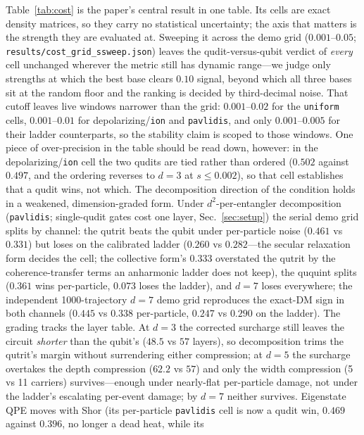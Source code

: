 \documentclass[aps,pra,reprint,superscriptaddress,nofootinbib,floatfix]{revtex4-2}
\begin{document}
Table~\ref{tab:cost} is the paper's central result in one table. Its
cells are exact density matrices, so they carry no statistical
uncertainty; the axis that matters is the strength they are evaluated
at. Sweeping it across the demo grid
($0.001$--$0.05$; \texttt{results/cost\_grid\_ssweep.json}) leaves the
qudit-versus-qubit verdict of \emph{every} cell unchanged wherever the
metric still has dynamic range---we judge only strengths at which the
best base clears $0.10$ signal, beyond which all three bases sit at the
random floor and the ranking is decided by third-decimal noise. That
cutoff leaves live windows narrower than the grid: $0.001$--$0.02$
for the \texttt{uniform} cells, $0.001$--$0.01$ for
depolarizing/\texttt{ion} and \texttt{pavlidis}, and only
$0.001$--$0.005$ for their ladder counterparts, so the stability
claim is scoped to those windows. One
piece of over-precision in the table should be read down, however: in
the depolarizing/\texttt{ion} cell the two qudits are tied rather than
ordered ($0.502$ against $0.497$, and the ordering reverses to $d=3$ at
$s\le0.002$), so that cell establishes that a qudit wins, not which.
The
decomposition direction of the condition holds in a weakened,
dimension-graded form. Under $d^2$-per-entangler decomposition
(\texttt{pavlidis}; single-qudit gates cost one layer,
Sec.~\ref{sec:setup}) the serial demo grid splits by channel: the
qutrit beats the qubit under per-particle noise
($0.461$ vs $0.331$) but loses on the calibrated ladder
($0.260$ vs $0.282$---the secular relaxation form decides the cell;
the collective form's $0.333$ overstated the qutrit by the
coherence-transfer terms an anharmonic ladder does not keep), the
ququint splits ($0.361$ wins per-particle, $0.073$ loses the
ladder), and $d=7$
loses everywhere; the independent 1000-trajectory $d=7$ demo grid
reproduces the exact-DM sign in both channels ($0.445$ vs $0.338$
per-particle, $0.247$ vs $0.290$ on the ladder). The grading tracks
the layer table. At $d=3$ the
corrected surcharge still leaves the circuit \emph{shorter} than the
qubit's ($48.5$ vs $57$ layers), so decomposition trims the qutrit's
margin without surrendering either compression; at $d=5$ the
surcharge overtakes the depth compression ($62.2$ vs $57$) and only
the width compression (5 vs 11 carriers) survives---enough under
nearly-flat per-particle damage, not under the ladder's escalating
per-event damage; by $d=7$ neither survives. Eigenstate QPE moves
with Shor (its per-particle \texttt{pavlidis} cell is now a qudit
win, $0.469$ against $0.396$, no longer a dead heat, while its
\end{document}
